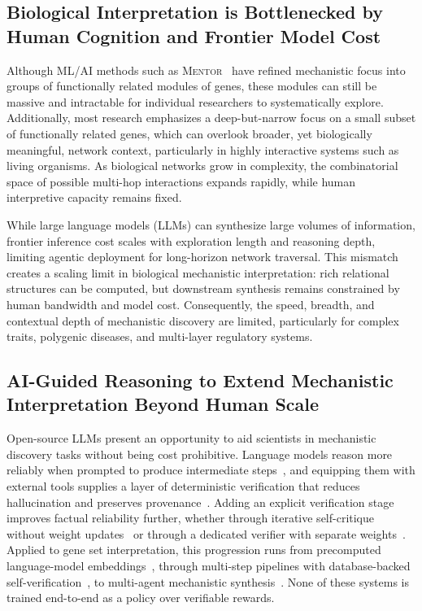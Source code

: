 \documentclass[thesis,letterpaper,12pt]{utthesis}
\begin{document}
\subsection{Biological Interpretation is Bottlenecked by Human Cognition and Frontier Model Cost}
Although ML/AI methods such as \textsc{Mentor}~\cite{mentor} have refined mechanistic focus into groups of functionally related modules of genes, these modules can still be massive and intractable for individual researchers to systematically explore. Additionally, most research emphasizes a deep-but-narrow focus on a small subset of functionally related genes, which can overlook broader, yet biologically meaningful, network context, particularly in highly interactive systems such as living organisms. As biological networks grow in complexity, the combinatorial space of possible multi-hop interactions expands rapidly, while human interpretive capacity remains fixed.

While large language models (LLMs) can synthesize large volumes of information, frontier inference cost scales with exploration length and reasoning depth, limiting agentic deployment for long-horizon network traversal. This mismatch creates a scaling limit in biological mechanistic interpretation: rich relational structures can be computed, but downstream synthesis remains constrained by human bandwidth and model cost. Consequently, the speed, breadth, and contextual depth of mechanistic discovery are limited, particularly for complex traits, polygenic diseases, and multi-layer regulatory systems.

\subsection{AI-Guided Reasoning to Extend Mechanistic Interpretation Beyond Human Scale}
Open-source LLMs present an opportunity to aid scientists in mechanistic discovery tasks without being cost prohibitive. Language models reason more reliably when prompted to produce intermediate steps~\cite{wei2022chain, kojima2022large}, and equipping them with external tools supplies a layer of deterministic verification that reduces hallucination and preserves provenance~\cite{schick2023toolformer, yao2022react}. Adding an explicit verification stage improves factual reliability further, whether through iterative self-critique without weight updates~\cite{madaan2023selfrefine, shinn2023reflexion} or through a dedicated verifier with separate weights~\cite{eubiota}. Applied to gene set interpretation, this progression runs from precomputed language-model embeddings~\cite{chen2025simple}, through multi-step pipelines with database-backed self-verification~\cite{wang2025geneagent}, to multi-agent mechanistic synthesis~\cite{mentor-ia, eubiota}. None of these systems is trained end-to-end as a policy over verifiable rewards.
\end{document}
